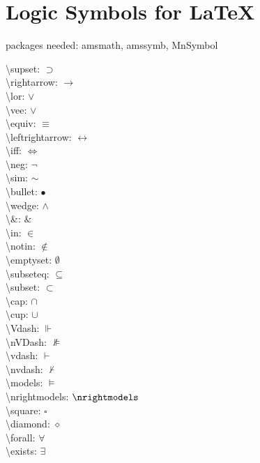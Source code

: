 \documentclass[12pt]{article}
\begin{document}
\section*{Logic Symbols for \LaTeX}
packages needed: amsmath, amssymb, MnSymbol\\
\begin{multicols}{2}
\Large
\textbackslash supset: $\supset$\\
\textbackslash rightarrow: $\rightarrow$\\
\textbackslash lor: $\lor$\\
\textbackslash vee: $\vee$\\
\textbackslash equiv: $\equiv$\\
\textbackslash leftrightarrow: $\leftrightarrow$\\
\textbackslash iff: $\iff$\\
\textbackslash neg: $\neg$\\
\textbackslash sim: $\sim$\\
\textbackslash bullet: $\bullet$\\
\textbackslash wedge: $\wedge$\\
\textbackslash \&: $\&$\\
\textbackslash in: $\in$\\
\textbackslash notin: $\notin$\\
\textbackslash emptyset: $\emptyset$\\
\textbackslash subseteq: $\subseteq$\\
\textbackslash subset: $\subset$\\
\textbackslash cap: $\cap$\\
\textbackslash cup: $\cup$\\
\textbackslash Vdash: $\Vdash$\\
\textbackslash nVDash: $\nVDash$\\
\textbackslash vdash: $\vdash$\\
\textbackslash nvdash: $\nvdash$\\
\textbackslash models: $\models$\\
\textbackslash nrightmodels: $\nrightmodels$\\
\textbackslash square: $\square$\\
\textbackslash diamond: $\diamond$\\
\textbackslash forall: $\forall$\\
\textbackslash exists: $\exists$\\
\end{multicols}
\end{document}
